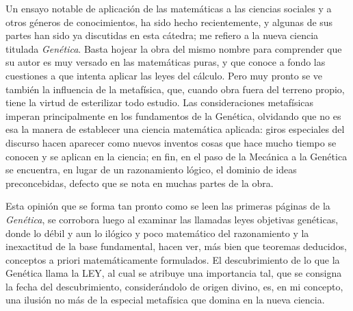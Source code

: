 \documentclass[a4paper, 12pt]{article}
\begin{document}
Un ensayo notable de aplicación de las matemáticas a las ciencias sociales y a otros géneros de conocimientos, ha sido hecho recientemente, y algunas de sus partes han sido ya discutidas en esta cátedra; me refiero a la nueva ciencia titulada {\it Genética}. Basta hojear la obra del mismo nombre para comprender que su autor es muy versado en las matemáticas puras, y que conoce a fondo las cuestiones a que intenta aplicar las leyes del cálculo. Pero muy pronto se ve también la influencia de la metafísica, que, cuando obra fuera del terreno propio, tiene la virtud de esterilizar todo estudio. Las consideraciones metafísicas imperan principalmente en los fundamentos de la Genética, olvidando que no es esa la manera de establecer una ciencia matemática aplicada: giros especiales del discurso hacen aparecer como nuevos inventos cosas que hace mucho tiempo se conocen y se aplican en la ciencia; en fin, en el paso de la Mecánica a la Genética se encuentra, en lugar de un razonamiento lógico, el dominio de ideas preconcebidas, defecto que se nota en muchas partes de la obra.

Esta opinión que se forma tan pronto como se leen las primeras páginas de la {\it Genética}, se corrobora luego al examinar las llamadas leyes objetivas genéticas, donde lo débil y aun lo ilógico y poco matemático del razonamiento y la inexactitud de la base fundamental, hacen ver, más bien que teoremas deducidos, conceptos a priori matemáticamente formulados. El descubrimiento de lo que la Genética llama la LEY, al cual se atribuye una importancia tal, que se consigna la fecha del descubrimiento, considerándolo de origen divino, es, en mi concepto, una ilusión no más de la especial metafísica que domina en la nueva ciencia.
\end{document}
